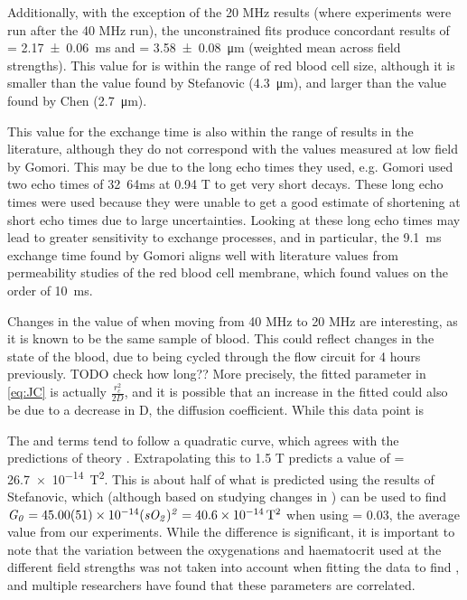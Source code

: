 Additionally, with the exception of the 20 MHz results (where experiments were run after the 40 MHz run), the unconstrained fits produce concordant results of \Texc = \SI{2.17\pm0.06}{ms} and \rc = \SI{3.58 \pm 0.08}{\micro\metre} (weighted mean across field strengths).
This value for \rc is within the range of red blood cell size, although it is smaller than the value found by Stefanovic (\SI{4.3}{\micro\metre})\cite{StefanovicHumanwholebloodrelaxometry2004}, and larger than the value found by Chen (\SI{2.7}{\micro\metre})\cite{ChenHumanwholeblood2009}.

This value for the exchange time is also within the range of results in the literature, although they do not correspond with the values measured at low field by Gomori\cite{GomoriNMRRelaxationTimes1987}.
This may be due to the long echo times they used, e.g. Gomori used two echo times of \SIlist{32}{64}{ms} at 0.94 T to get very short \Ttwo decays.
These long echo times were used because they were unable to get a good estimate of \Ttwo shortening at short echo times due to large uncertainties.
Looking at these long echo times may lead to greater sensitivity to exchange processes, and in particular, the \SI{9.1}{ms} exchange time found by Gomori aligns well with literature values from permeability studies of the red blood cell membrane, which found values on the order of \SI{10}{ms}\cite{Herbstreviewwaterdiffusion1989}.

Changes in the value of \rc when moving from 40 MHz to 20 MHz are interesting, as it is known to be the same sample of blood.
This could reflect changes in the state of the blood, due to being cycled through the flow circuit for 4 hours previously. TODO check how long??
More precisely, the fitted parameter in \autoref{eq:JC} is actually $\mathit{\frac{r_c^2}{2D}}$, and it is possible that an increase in the fitted \rc could also be due to a decrease in D, the diffusion coefficient.
While this data point is

The \Kzero and \Gzero terms tend to follow a quadratic curve, which agrees with the predictions of theory \cite[Eq. 52-54]{JensenNMRrelaxationtissues2000}.
Extrapolating this to 1.5 T predicts a value of \Gzero = \SI{26.7e-14}{T^2}.
This is about half of what is predicted using the results of Stefanovic, which (although based on studying changes in \SOtwo) can be used to find $\mathit{G_0} = \num{45\pm0.51e-14}  \mathit{(sO_2)^2} = \SI{40.6e-14}{T^2}$ when using \SOtwo = 0.03, the average value from our experiments.
While the difference is significant, it is important to note that the variation between the oxygenations and haematocrit used at the different field strengths was not taken into account when fitting the data to find \Gzero, and multiple researchers \cite{StefanovicHumanwholebloodrelaxometry2004,ChenHumanwholeblood2009,GardenerDependencebloodR22010} have found that these parameters are correlated.

